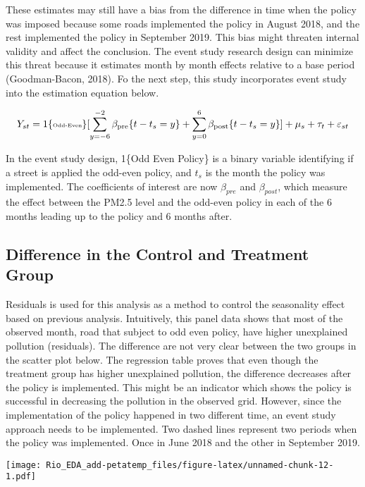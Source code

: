 \documentclass[
]{article}
\begin{document}
These estimates may still have a bias from the difference in time when
the policy was imposed because some roads implemented the policy in
August 2018, and the rest implemented the policy in September 2019. This
bias might threaten internal validity and affect the conclusion. The
event study research design can minimize this threat because it
estimates month by month effects relative to a base period
(Goodman-Bacon, 2018). Fo the next step, this study incorporates event
study into the estimation equation below.

\[
\tiny Y_{st} = 1\{\text{Odd-Even}\}[\sum_{y=-6}^{-2}\beta_{\text{pre}}\{t - t_s = y\} + \sum_{y=0}^{6}\beta_{\text{post}}\{t - t_s = y\}] + \mu_s + \tau_t + \varepsilon_{st}
\]

In the event study design, 1\{Odd Even Policy\} is a binary variable
identifying if a street is applied the odd-even policy, and \(t_s\) is
the month the policy was implemented. The coefficients of interest are
now \(\beta_{pre}\) and \(\beta_{post}\), which measure the effect
between the PM2.5 level and the odd-even policy in each of the 6 months
leading up to the policy and 6 months after.

\hypertarget{difference-in-the-control-and-treatment-group}{%
\subsection{Difference in the Control and Treatment
Group}\label{difference-in-the-control-and-treatment-group}}

Residuals is used for this analysis as a method to control the
seasonality effect based on previous analysis. Intuitively, this panel
data shows that most of the observed month, road that subject to odd
even policy, have higher unexplained pollution (residuals). The
difference are not very clear between the two groups in the scatter plot
below. The regression table proves that even though the treatment group
has higher unexplained pollution, the difference decreases after the
policy is implemented. This might be an indicator which shows the policy
is successful in decreasing the pollution in the observed grid. However,
since the implementation of the policy happened in two different time,
an event study approach needs to be implemented. Two dashed lines
represent two periods when the policy was implemented. Once in June 2018
and the other in September 2019.

\texttt{[image: Rio\_EDA\_add-petatemp\_files/figure-latex/unnamed-chunk-12-1.pdf]}
\end{document}
